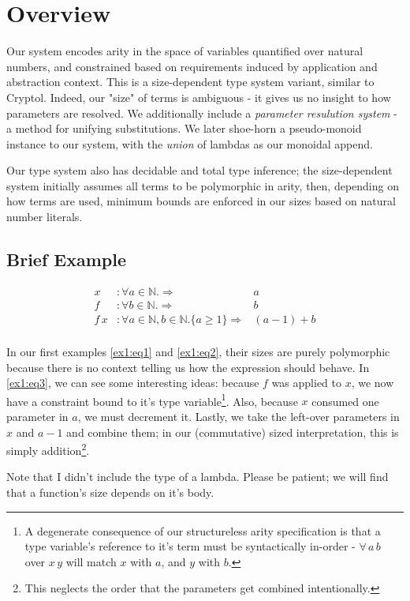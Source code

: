\documentclass{article}
\begin{document}
\section{Overview}

\begin{flushleft}
Our system encodes arity in the space of variables quantified over natural
numbers, and constrained based on requirements induced by application and
abstraction context. This is a size-dependent type system variant, similar to
Cryptol. Indeed, our "size" of terms is ambiguous - it gives us no insight
to how parameters are resolved. We additionally include a \textit{parameter
resulution system} - a method for unifying substitutions. We later shoe-horn
a pseudo-monoid instance to our system, with the \textit{union} of lambdas as our
monoidal append.

Our type system also has decidable and total type inference; the size-dependent
system initially assumes all terms to be polymorphic in arity, then, depending
on how terms are used, minimum bounds are enforced in our sizes based on natural
number literals.
\end{flushleft}

\subsection{Brief Example}

\begin{align}
x &: \forall a \in \mathbb{N}. \Rightarrow &a\label{ex1:eq1}\\
f &: \forall b \in \mathbb{N}. \Rightarrow &b\label{ex1:eq2}\\
f \, x &: \forall a \in \mathbb{N}, b \in \mathbb{N}.
\{a \geq 1\} \Rightarrow &(a - 1) + b\label{ex1:eq3}\\
\end{align}

\begin{flushleft}
In our first examples \ref{ex1:eq1} and \ref{ex1:eq2}, their sizes are purely
polymorphic because there is no context telling us how the expression should
behave. In \ref{ex1:eq3}, we can see some interesting ideas: because $f$ was
applied to $x$, we now have a constraint bound to it's
type variable\footnote{A degenerate consequence of our structureless arity specification
is that a type variable's reference to it's term must be syntactically in-order -
$\forall \, a \, b$ over $x \, y$ will match $x$ with $a$, and $y$ with $b$.}.
Also, because $x$ consumed one parameter in $a$, we must decrement it. Lastly,
we take the left-over parameters in $x$ and $a-1$ and combine them; in our
(commutative) sized interpretation, this is simply addition\footnote{This
neglects the order that the parameters get combined intentionally.}.

Note that I didn't include the type of a lambda. Please be patient; we will find
that a function's size depends on it's body.
\end{flushleft}
\end{document}
